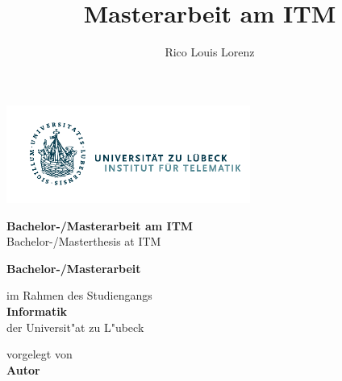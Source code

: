 \documentclass[
	ngerman,
	11pt,
	twoside,
	a4paper,
	headsepline,
	footsepline, 
	toc=bib
]{scrbook}
\begin{document}
\begin{titlepage}

\title{Masterarbeit am ITM}
\author{Rico Louis Lorenz}

{\Large
	\includegraphics[width=80mm]{images/Logo_Inst_Telematik_cropped.pdf}
	\vskip 44pt


	\textbf{\LARGE Bachelor-/Masterarbeit am ITM}\\
	\LARGE Bachelor-/Masterthesis at ITM

	\titlepageskip
	\textbf{Bachelor-/Masterarbeit}

	\titlepageskip
	im Rahmen des Studiengangs\\
	\textbf{Informatik}\\
	der Universit"at zu L"ubeck

	\titlepageskip
	vorgelegt von\\
	\textbf{Autor}

}
\end{titlepage}
\end{document}
